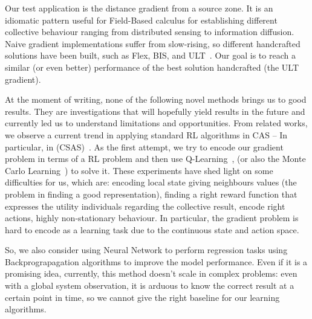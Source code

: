 \documentclass[conference]{IEEEtran}
\begin{document}
Our test application is the distance gradient from a source zone. %
%
It is an idiomatic pattern useful for Field-Based calculus for establishing different collective behaviour ranging from distributed sensing to information diffusion.
%
Naive gradient implementations suffer from slow-rising, so different handcrafted solutions have been built, such as Flex, BIS, and ULT~\cite{DBLP:conf/saso/AudritoCDV17}.
%
Our goal is to reach a similar (or even better) performance of the best solution handcrafted (the ULT gradient).

At the moment of writing, none of the following novel methods brings us to good results. They are investigations that will hopefully yield results in the future and currently led us to understand limitations and opportunities.
%
From related works, we observe a current trend in applying standard RL algorithms in CAS -- In particular, in (CSAS)~\cite{DAngelo2019}.
%
%
As the first attempt, we try to encode our gradient problem in terms of a RL problem and then use Q-Learning~\cite{DBLP:journals/ras/Krose95}, (or also the Monte Carlo Learning~\cite{DBLP:conf/nips/Thrun99}) to solve it.
%
These experiments have shed light on some difficulties for us, which are: encoding local state giving neighbours values (the problem in finding a good representation), finding a right reward function that expresses the utility individuals
regarding the collective result, encode right actions, highly non-stationary behaviour. 
%
In particular, the gradient problem is hard to encode as a learning task due to the continuous state and action space.

So, we also consider using Neural Network to perform regression tasks using Backprograpagation algorithms to improve the model performance.
% 
Even if it is a promising idea, currently, this method doesn't scale in complex problems: even with a global system observation, it is arduous to know the correct result at a certain point in time, so 
we cannot give the right baseline for our learning algorithms.
\end{document}
